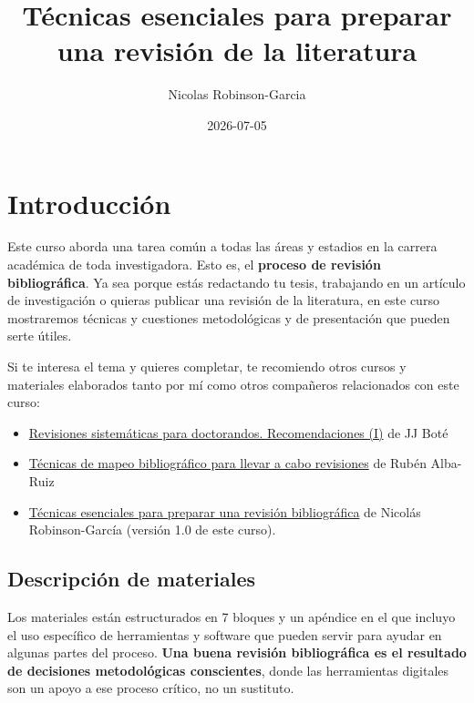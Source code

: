 \documentclass[
]{book}
\title{Técnicas esenciales para preparar una revisión de la literatura}
\author{Nicolas Robinson-Garcia}
\date{2026-07-05}
\providecommand{\tightlist}{%
  \setlength{\itemsep}{0pt}\setlength{\parskip}{0pt}}
\begin{document}
\maketitle

{
\setcounter{tocdepth}{1}
\tableofcontents
}
\chapter*{Introducción}\label{introducciuxf3n}

Este curso aborda una tarea común a todas las áreas y estadios en la carrera académica de toda investigadora. Esto es, el \textbf{proceso de revisión bibliográfica}. Ya sea porque estás redactando tu tesis, trabajando en un artículo de investigación o quieras publicar una revisión de la literatura, en este curso mostraremos técnicas y cuestiones metodológicas y de presentación que pueden serte útiles.

Si te interesa el tema y quieres completar, te recomiendo otros cursos y materiales elaborados tanto por mí como otros compañeros relacionados con este curso:

\begin{itemize}
\tightlist
\item
  \href{https://yosigo.ugr.es/courses/revisiones-sistematicas-para-doctorandos-i/}{Revisiones sistemáticas para doctorandos. Recomendaciones (I)} de JJ Boté
\item
  \href{https://yosigo.ugr.es/courses/tecnicas-de-mapeo-bibliografico-para-llevar-a-cabo-revisiones-ii-second-edition/}{Técnicas de mapeo bibliográfico para llevar a cabo revisiones} de Rubén Alba-Ruiz
\item
  \href{https://www.youtube.com/watch?v=iS3SbpYf98o}{Técnicas esenciales para preparar una revisión bibliográfica} de Nicolás Robinson-García (versión 1.0 de este curso).
\end{itemize}

\section*{Descripción de materiales}\label{descripciuxf3n-de-materiales}

Los materiales están estructurados en 7 bloques y un apéndice en el que incluyo el uso específico de herramientas y software que pueden servir para ayudar en algunas partes del proceso. \textbf{Una buena revisión bibliográfica es el resultado de decisiones metodológicas conscientes}, donde las herramientas digitales son un apoyo a ese proceso crítico, no un sustituto.
\end{document}
